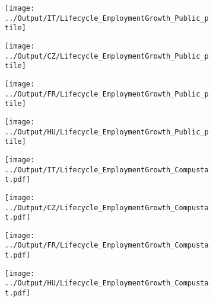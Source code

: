 \documentclass[12pt,notitlepage]{article}
\begin{document}
\begin{figure}[!htpb]
\centering
\caption{Percentiles of Employment Growth (Public Firms in Orbis)}
\begin{subfigure}{.49\textwidth}
    \centering
 \texttt{[image: ../Output/IT/Lifecycle\_EmploymentGrowth\_Public\_ptile]}
\end{subfigure}%
\begin{subfigure}{.49\textwidth}
    \centering
 \texttt{[image: ../Output/CZ/Lifecycle\_EmploymentGrowth\_Public\_ptile]}
\end{subfigure}
\begin{subfigure}{.49\textwidth}
    \centering
 \texttt{[image: ../Output/FR/Lifecycle\_EmploymentGrowth\_Public\_ptile]}
\end{subfigure}%
\begin{subfigure}{.49\textwidth}
    \centering
 \texttt{[image: ../Output/HU/Lifecycle\_EmploymentGrowth\_Public\_ptile]}
\end{subfigure}
\end{figure}
\pagebreak



\begin{figure}[!htpb]
\centering
\caption{Percentiles of Employment Growth (Public Firms in Compustat)}
\begin{subfigure}{.49\textwidth}
    \centering
 \texttt{[image: ../Output/IT/Lifecycle\_EmploymentGrowth\_Compustat.pdf]}
\end{subfigure}%
\begin{subfigure}{.49\textwidth}
    \centering
 \texttt{[image: ../Output/CZ/Lifecycle\_EmploymentGrowth\_Compustat.pdf]}
\end{subfigure}
\begin{subfigure}{.49\textwidth}
    \centering
 \texttt{[image: ../Output/FR/Lifecycle\_EmploymentGrowth\_Compustat.pdf]}
\end{subfigure}%
\begin{subfigure}{.49\textwidth}
    \centering
 \texttt{[image: ../Output/HU/Lifecycle\_EmploymentGrowth\_Compustat.pdf]}
\end{subfigure}
\end{figure}
\pagebreak


\end{document}
